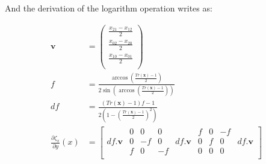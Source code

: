 And the derivation of the logarithm operation writes as:

\begin{align}
\label{eq:diffLogSO3Matrix}
  \mathbf{v} &= \begin{pmatrix}
    \frac{x_{21} - x_{12}}{2}\\
    \frac{x_{02} - x_{20}}{2}\\
    \frac{x_{10} - x_{01}}{2}\\
  \end{pmatrix} \\
  f &= \frac{\arccos \left( \frac{Tr(\mathbf{x})-1}{2} \right)}{2 \sin \left( \arccos \left( \frac{Tr(\mathbf{x})-1}{2} \right) \right) } \\
  df &= \frac{\left(Tr(\mathbf{x})-1\right)f-1}{2 \left( 1- {\left( \frac{Tr(\mathbf{x})-1}{2} \right)}^2 \right)} \\
  \frac{\partial \zeta_x}{\partial y}(x) &= \begin{bmatrix}
      & 0 & 0 & 0 &  & f & 0 & -f &  \\
    df.\mathbf{v} & 0 & -f & 0 & df.\mathbf{v} & 0 & f & 0 & df.\mathbf{v}  \\
      & f & 0 & -f &  & 0 & 0 & 0 &  \\
  \end{bmatrix}
\end{align}

